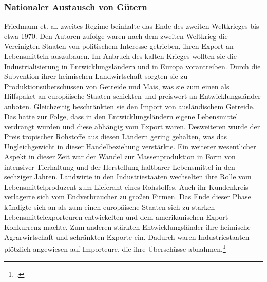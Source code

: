 \documentclass{scrartcl}
\begin{document}
\subsubsection*{Nationaler Austausch von Gütern}
Friedmann et. al. zweites Regime beinhalte das Ende des zweiten Weltkrieges bis etwa 1970. Den Autoren zufolge waren nach dem zweiten Weltkrieg die Vereinigten Staaten von politischem Interesse getrieben, ihren Export an Lebensmitteln auszubauen. Im Anbruch des kalten Krieges wollten sie die Industrialisierung in Entwicklungsländern und in Europa vorantreiben. Durch die Subvention ihrer heimischen Landwirtschaft sorgten sie zu Produktionsüberschüssen von Getreide und Mais, was sie zum einen als Hilfspaket an europäische Staaten schickten und preiswert an Entwicklungsländer anboten. Gleichzeitig beschränkten sie den Import von ausländischem Getreide. Das hatte zur Folge, dass in den Entwicklungsländern eigene Lebensmittel verdrängt wurden und diese abhängig vom Export waren. Desweiteren wurde der Preis tropischer Rohstoffe aus diesen Ländern gering gehalten, was das Ungleichgewicht in dieser Handelbeziehung verstärkte. Ein weiterer wesentlicher Aspekt in dieser Zeit war der Wandel zur Massenproduktion in Form von intensiver Tierhaltung und der Herstellung haltbarer Lebensmittel in den sechziger Jahren. Landwirte in den Industriestaaten wechselten ihre Rolle vom Lebensmittelproduzent zum Lieferant eines Rohstoffes. Auch ihr Kundenkreis verlagerte sich vom Endverbraucher zu großen Firmen. Das Ende dieser Phase kündigte sich an als zum einen europäische Staaten sich zu starken Lebensmittelexporteuren entwickelten und dem amerikanischen Export Konkurrenz machte. Zum anderen stärkten Entwicklungsländer ihre heimische Agrarwirtschaft und schränkten Exporte ein. Dadurch waren Industriestaaten plötzlich angewiesen auf Importeure, die ihre Überschüsse abnahmen.\footcite[Vgl.][S.103ff]{Friedmann1989AGRICULTUREPresent}
\end{document}
